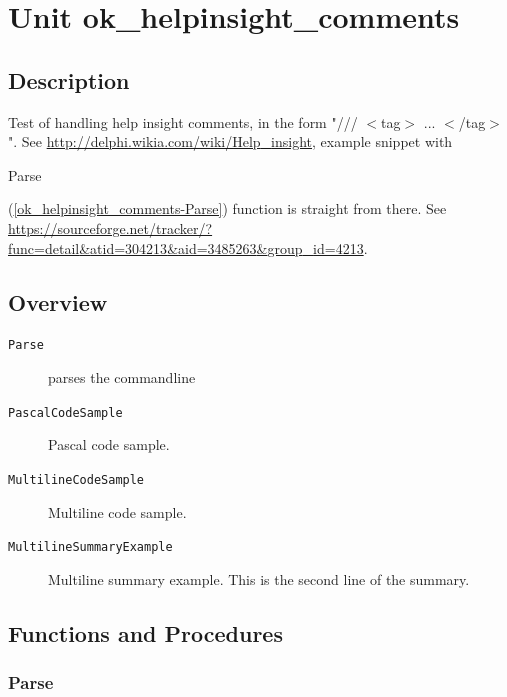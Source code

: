 \documentclass{report}
\newif\ifpdf
\begin{document}
\label{toc}\tableofcontents
\newpage
\newlength{\tmplength}
\chapter{Unit ok{\_}helpinsight{\_}comments}
\label{ok_helpinsight_comments}
\section{Description}
Test of handling help insight comments, in the form "/// {$<$}tag{$>$} ... {$<$}/tag{$>$}". See \href{http://delphi.wikia.com/wiki/Help_insight}{http://delphi.wikia.com/wiki/Help{\_}insight}, example snippet with \begin{ttfamily}Parse\end{ttfamily}(\ref{ok_helpinsight_comments-Parse}) function is straight from there. See \href{https://sourceforge.net/tracker/?func=detail&atid=304213&aid=3485263&group_id=4213}{https://sourceforge.net/tracker/?func=detail{\&}atid=304213{\&}aid=3485263{\&}group{\_}id=4213}.
\section{Overview}
\begin{description}
\item[\texttt{Parse}]parses the commandline
\item[\texttt{PascalCodeSample}]Pascal code sample.
\item[\texttt{MultilineCodeSample}]Multiline code sample.
\item[\texttt{MultilineSummaryExample}] Multiline summary example. This is the second line of the summary. 
\end{description}
\section{Functions and Procedures}
\ifpdf
\subsection*{\large{\textbf{Parse}}\normalsize\hspace{1ex}\hrulefill}
\else
\end{document}
